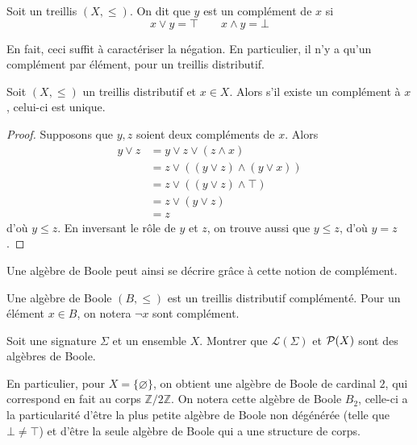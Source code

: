 \begin{definition}[Complément]
  Soit un treillis $(X,\leq)$. On dit que $y$ est un complément de $x$ si
  \[x\lor y = \top \qquad x \land y = \bot\]
\end{definition}

En fait, ceci suffit à caractériser la négation. En particulier, il n'y a qu'un
complément par élément, pour un treillis distributif.

\begin{proposition}
  Soit $(X,\leq)$ un treillis distributif et $x\in X$. Alors s'il existe un
  complément à $x$, celui-ci est unique.
\end{proposition}

\begin{proof}
  Supposons que $y,z$ soient deux compléments de $x$. Alors
  \begin{align*}
    y\lor z &= y\lor z\lor (z\land x)\\
    &= z\lor ((y\lor z)\land (y\lor x))\\
    &= z \lor ((y\lor z)\land \top)\\
    &= z \lor (y\lor z)\\
    &= z
  \end{align*}
  d'où $y\leq z$. En inversant le rôle de $y$ et $z$, on trouve aussi que
  $y\leq z$, d'où $y = z$.
\end{proof}

Une algèbre de Boole peut ainsi se décrire grâce à cette notion de complément.

\begin{definition}
  Une algèbre de Boole $(B,\leq)$ est un treillis distributif complémenté. Pour
  un élément $x\in B$, on notera $\lnot x$ sont complément.
\end{definition}

\begin{exercise}
  Soit une signature $\Sigma$ et un ensemble $X$. Montrer que
  $\mathcal L(\Sigma)$ et $\mathcal{P}(X)$ sont des algèbres de Boole.
\end{exercise}

\begin{remark}
  En particulier, pour $X = \{\varnothing\}$, on obtient une algèbre de Boole
  de cardinal $2$, qui correspond en fait au corps $\mathbb Z/2\mathbb Z$.
  On notera cette algèbre de Boole $B_2$, celle-ci a la particularité d'être
  la plus petite algèbre de Boole non dégénérée (telle que $\bot \neq \top$) et
  d'être la seule algèbre de Boole qui a une structure de corps.
\end{remark}

